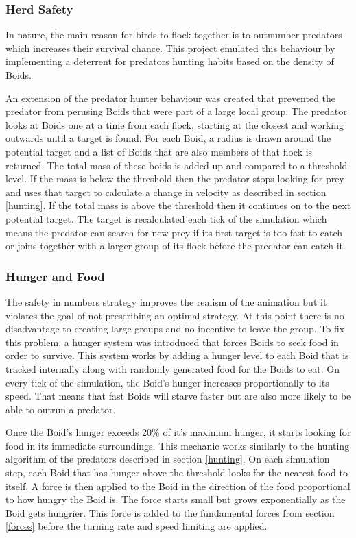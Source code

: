 \documentclass{egpubl}
\begin{document}
\subsubsection{Herd Safety}
\label{herdImmunity}
In nature, the main reason for birds to flock together is to outnumber predators which increases their survival chance. This project emulated this behaviour by implementing a deterrent for predators hunting habits based on the density of Boids.
\par
An extension of the predator hunter behaviour was created that prevented the predator from perusing Boids that were part of a large local group. The predator looks at Boids one at a time from each flock, starting at the closest and working outwards until a target is found. For each Boid, a radius is drawn around the potential target and a list of Boids that are also members of that flock is returned. The total mass of these boids is added up and compared to a threshold level. If the mass is below the threshold then the predator stops looking for prey and uses that target to calculate a change in velocity as described in section \ref{hunting}. If the total mass is above the threshold then it continues on to the next potential target. The target is recalculated each tick of the simulation which means the predator can search for new prey if its first target is too fast to catch or joins together with a larger group of its flock before the predator can catch it.
\subsubsection{Hunger and Food}
\label{hunger}
The safety in numbers strategy improves the realism of the animation but it violates the goal of not prescribing an optimal strategy. At this point there is no disadvantage to creating large groups and no incentive to leave the group. To fix this problem, a hunger system was introduced that forces Boids to seek food in order to survive. This system works by adding a hunger level to each Boid that is tracked internally along with randomly generated food for the Boids to eat. On every tick of the simulation, the Boid's hunger increases proportionally to its speed. That means that fast Boids will starve faster but are also more likely to be able to outrun a predator. 
\par
Once the Boid's hunger exceeds 20\% of it's maximum hunger, it starts looking for food in its immediate surroundings. This mechanic works similarly to the hunting algorithm of the predators described in section \ref{hunting}. On each simulation step, each Boid that has hunger above the threshold looks for the nearest food to itself. A force is then applied to the Boid in the direction of the food proportional to how hungry the Boid is. The force starts small but grows exponentially as the Boid gets hungrier. This force is added to the fundamental forces from section \ref{forces} before the turning rate and speed limiting are applied.
\end{document}
